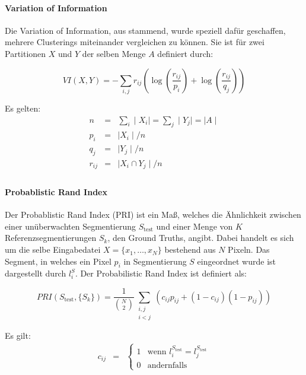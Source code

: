 \paragraph{Variation of Information}

Die Variation of Information, aus \cite{meil_03} stammend, wurde speziell dafür geschaffen, mehrere Clusterings miteinander vergleichen zu können. Sie ist für zwei Partitionen $X$ und $Y$ der selben Menge $A$ definiert durch:

\begin{equation}
VI(X, Y) = -\sum_{i, j} r_{ij}\left(\log\left(\frac{r_{ij}}{p_i}\right)+\log\left(\frac{r_{ij}}{q_j}\right)\right)
\end{equation}

Es gelten:
\begin{eqnarray}
n&=&\sum_i\mid X_i\mid=\sum_j \mid Y_j\mid=\mid A\mid\\
p_i&=&\mid X_i\mid/n\\
q_j&=&\mid Y_j\mid/n\\
r_{ij}&=&\mid X_i\cap Y_j\mid/n\\
\end{eqnarray}

\paragraph{Probablistic Rand Index}

Der Probablistic Rand Index (PRI) ist ein Maß, welches die Ähnlichkeit zwischen einer unüberwachten Segmentierung $S_\text{test}$ und einer Menge von $K$ Referenzsegmentierungen $S_k$, den Ground Truths, angibt. Dabei handelt es sich um die selbe Eingabedatei $X=\{x_1,\ldots,x_N\}$ bestehend aus $N$ Pixeln. Das Segment, in welches ein Pixel $p_i$ in Segmentierung $S$ eingeordnet wurde ist dargestellt durch $l_i^S$. Der Probabilistic Rand Index ist definiert als: \cite{pantofaru_07}

\begin{equation}
\label{eqn:pri1}
PRI(S_\text{test}, \{S_k\}) = \frac{1}{\binom{N}{2}} \sum_{\substack{i,j\\i<j}} \left(c_{ij}p_{ij}+\left(1-c_{ij}\right)\left(1-p_{ij}\right)\right)
\end{equation}

Es gilt:
\begin{eqnarray}
c_{ij}&=&\begin{cases}
1 & \text{wenn } l_i^{S_\text{test}}=l_j^{S_\text{test}}\\
0 & \text{andernfalls}
\end{cases}
\end{eqnarray}

